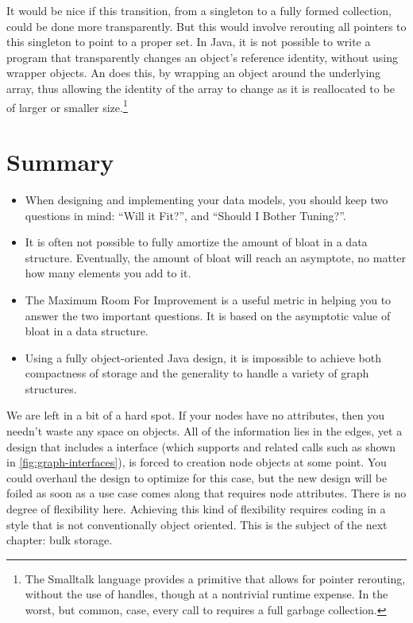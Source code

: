 It would be nice if this transition, from a singleton to a fully formed
collection, could be done more transparently. But this would involve rerouting
all pointers to this singleton to point to a proper set. In Java, it is not
possible to write a program that transparently changes an object's reference
identity, without using wrapper objects.
An  does this, by wrapping an object around the underlying
array, thus allowing the identity of the array to change as it is reallocated
to be of larger or smaller size.\footnote{The Smalltalk
language provides a  primitive that allows for pointer
rerouting, without the use of handles, though at a nontrivial runtime expense.
In the worst, but common, case, every call to  requires a full
garbage collection.}

\section{Summary}

\begin{itemize}
  \item When designing and implementing your data models, you should keep two
  questions in mind: ``Will it Fit?'', and ``Should I Bother Tuning?''.
  \item It is often not possible to fully amortize the amount of bloat in a data
  structure. Eventually, the amount of bloat will reach an asymptote, no matter
  how many elements you add to it.
  \item The Maximum Room For Improvement is a useful metric in helping you to
  answer the two important questions. It is based on the asymptotic value of
  bloat in a data structure.
  \item Using a fully object-oriented Java design, it is impossible to achieve
  both compactness of storage and the generality to handle a variety of graph
structures. 
\end{itemize}

We are left in a bit of a hard spot. If your nodes have no attributes, then you
needn't waste any space on  objects. All of the information lies in
the edges, yet a design that includes a  interface (which supports
 and related calls such as shown in
\autoref{fig:graph-interfaces}), is forced to creation node objects at some
point. You could overhaul the design to optimize for this case, but the new
design will be foiled as soon as a use case comes along that requires node
attributes. There is no degree of flexibility here. Achieving this kind of
flexibility requires coding in a style that is not conventionally object
oriented. This is the subject of the next chapter: bulk storage.

